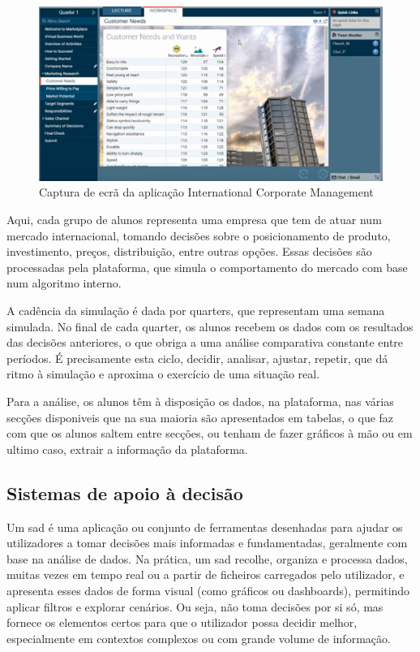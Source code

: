\begin{figure}[h]
    \centering
    \includegraphics[width=\textwidth]{./img/marketplace1}
 \caption{Captura de ecrã da aplicação International Corporate Management}
 \end{figure}

Aqui, cada grupo de alunos representa uma empresa que tem de atuar num mercado internacional, tomando decisões sobre o posicionamento de produto, investimento, preços, distribuição, entre outras opções. Essas decisões são processadas pela plataforma, que simula o comportamento do mercado com base num algoritmo interno. 

A cadência da simulação é dada por quarters, que representam uma semana simulada. No final de cada quarter, os alunos recebem os dados com os resultados das decisões anteriores, o que obriga a uma análise comparativa constante entre períodos. É precisamente esta ciclo, decidir, analisar, ajustar, repetir, que dá ritmo à simulação e aproxima o exercício de uma situação real.

Para a análise, os alunos têm à disposição os dados, na plataforma,  nas várias secções disponiveis que na sua maioria são apresentados em tabelas, o que faz com que os alunos saltem entre secções, ou tenham de fazer gráficos à mão ou em ultimo caso, extrair a informação da plataforma. 

\subsection{Sistemas de apoio à decisão}
\label{sec:sad}
Um \gls{sad} é uma aplicação ou conjunto de ferramentas desenhadas para ajudar os utilizadores a tomar decisões mais informadas e fundamentadas, geralmente com base na análise de dados. Na prática, um \gls{sad} recolhe, organiza e processa dados, muitas vezes em tempo real ou a partir de ficheiros carregados pelo utilizador, e apresenta esses dados de forma visual (como gráficos ou dashboards), permitindo aplicar filtros e explorar cenários. Ou seja, não toma decisões por si só, mas fornece os elementos certos para que o utilizador possa decidir melhor, especialmente em contextos complexos ou com grande volume de informação.


